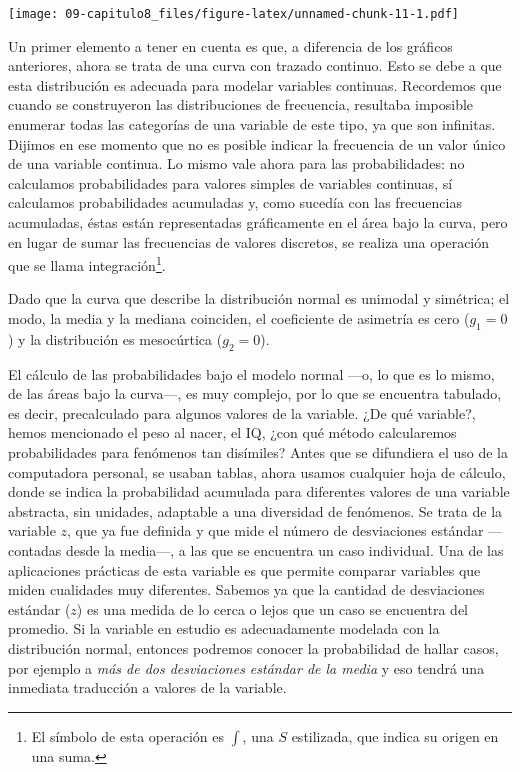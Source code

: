 \documentclass[]{article}
\let\rmarkdownfootnote\footnote%
\def\footnote{\protect\rmarkdownfootnote}
\begin{document}
\texttt{[image: 09-capitulo8\_files/figure-latex/unnamed-chunk-11-1.pdf]}

Un primer elemento a tener en cuenta es que, a diferencia de los
gráficos anteriores, ahora se trata de una curva con trazado continuo.
Esto se debe a que esta distribución es adecuada para modelar variables
continuas. Recordemos que cuando se construyeron las distribuciones de
frecuencia, resultaba imposible enumerar todas las categorías de una
variable de este tipo, ya que son infinitas. Dijimos en ese momento que
no es posible indicar la frecuencia de un valor único de una variable
continua. Lo mismo vale ahora para las probabilidades: no calculamos
probabilidades para valores simples de variables continuas, sí
calculamos probabilidades acumuladas y, como sucedía con las frecuencias
acumuladas, éstas están representadas gráficamente en el área bajo la
curva, pero en lugar de sumar las frecuencias de valores discretos, se
realiza una operación que se llama integración\footnote{El símbolo de
  esta operación es \(\int\), una \(S\) estilizada, que indica su origen
  en una suma.}.

Dado que la curva que describe la distribución normal es unimodal y
simétrica; el modo, la media y la mediana coinciden, el coeficiente de
asimetría es cero (\(g_{1}=0\)) y la distribución es mesocúrtica
(\(g_{2}=0\)).

El cálculo de las probabilidades bajo el modelo normal ---o, lo que es
lo mismo, de las áreas bajo la curva---, es muy complejo, por lo que se
encuentra tabulado, es decir, precalculado para algunos valores de la
variable. ¿De qué variable?, hemos mencionado el peso al nacer, el IQ,
¿con qué método calcularemos probabilidades para fenómenos tan
disímiles? Antes que se difundiera el uso de la computadora personal, se
usaban tablas, ahora usamos cualquier hoja de cálculo, donde se indica
la probabilidad acumulada para diferentes valores de una variable
abstracta, sin unidades, adaptable a una diversidad de fenómenos. Se
trata de la variable \(z\), que ya fue definida y que mide el número de
desviaciones estándar ---contadas desde la media---, a las que se
encuentra un caso individual. Una de las aplicaciones prácticas de esta
variable es que permite comparar variables que miden cualidades muy
diferentes. Sabemos ya que la cantidad de desviaciones estándar (\(z\))
es una medida de lo cerca o lejos que un caso se encuentra del promedio.
Si la variable en estudio es adecuadamente modelada con la distribución
normal, entonces podremos conocer la probabilidad de hallar casos, por
ejemplo a \emph{más de dos desviaciones estándar de la media} y eso
tendrá una inmediata traducción a valores de la variable.
\end{document}
